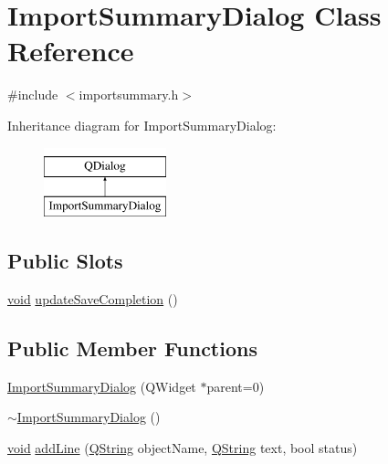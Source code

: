 \hypertarget{class_import_summary_dialog}{\section{Import\-Summary\-Dialog Class Reference}
\label{class_import_summary_dialog}
}


{\ttfamily \#include $<$importsummary.\-h$>$}

Inheritance diagram for Import\-Summary\-Dialog\-:\begin{figure}[H]
\begin{center}
\leavevmode
\includegraphics[height=2.000000cm]{class_import_summary_dialog}
\end{center}
\end{figure}
\subsection*{Public Slots}
\begin{DoxyCompactItemize}
\item 
\hyperlink{group___u_a_v_objects_plugin_ga444cf2ff3f0ecbe028adce838d373f5c}{void} \hyperlink{group___u_a_v_settings_import_export_gaf0532662634d23c11f3812ece8a170bb}{update\-Save\-Completion} ()
\end{DoxyCompactItemize}
\subsection*{Public Member Functions}
\begin{DoxyCompactItemize}
\item 
\hyperlink{group___u_a_v_settings_import_export_ga715ec099ff29a7acc3887e20f22219da}{Import\-Summary\-Dialog} (Q\-Widget $\ast$parent=0)
\item 
\hyperlink{group___u_a_v_settings_import_export_gaf410b79676dfd8f6636650a3d9ef48e2}{$\sim$\-Import\-Summary\-Dialog} ()
\item 
\hyperlink{group___u_a_v_objects_plugin_ga444cf2ff3f0ecbe028adce838d373f5c}{void} \hyperlink{group___u_a_v_settings_import_export_ga16fa18af8950ac368ac63851b4c8e409}{add\-Line} (\hyperlink{group___u_a_v_objects_plugin_gab9d252f49c333c94a72f97ce3105a32d}{Q\-String} object\-Name, \hyperlink{group___u_a_v_objects_plugin_gab9d252f49c333c94a72f97ce3105a32d}{Q\-String} text, bool status)
\end{DoxyCompactItemize}
